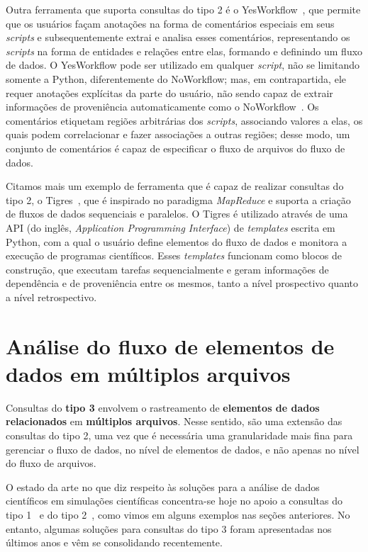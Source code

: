 Outra ferramenta que suporta consultas do tipo 2 é o YesWorkflow~\cite{mcphillips2015yesworkflow}, que permite que os usuários façam anotações na forma de comentários especiais em seus \textit{scripts} e subsequentemente extrai e analisa esses comentários, representando os \textit{scripts} na forma de entidades e relações entre elas, formando e definindo um fluxo de dados. O YesWorkflow pode ser utilizado em qualquer \textit{script}, não se limitando somente a Python, diferentemente do NoWorkflow; mas, em contrapartida, ele requer anotações explícitas da parte do usuário, não sendo capaz de extrair informações de proveniência automaticamente como o NoWorkflow~\cite{Pimentel2016}. Os comentários etiquetam regiões arbitrárias dos \textit{scripts}, associando valores a elas, os quais podem correlacionar e fazer associações a outras regiões; desse modo, um conjunto de comentários é capaz de especificar o fluxo de arquivos do fluxo de dados.

Citamos mais um exemplo de ferramenta que é capaz de realizar consultas do tipo 2, o Tigres~\cite{hendrix2016tigres}, que é inspirado no paradigma \textit{MapReduce} e suporta a criação de fluxos de dados sequenciais e paralelos. O Tigres é utilizado através de uma  API (do inglês, \textit{Application Programming Interface}) de \textit{templates} escrita em Python, com a qual o usuário define elementos do fluxo de dados e monitora a execução de programas científicos. Esses \textit{templates} funcionam como blocos de construção, que executam tarefas sequencialmente e geram informações de dependência e de proveniência entre os mesmos, tanto a nível prospectivo quanto a nível retrospectivo.

\section{Análise do fluxo de elementos de dados em múltiplos arquivos}%
\label{sec:rastreamento-de-elemento-de-dados-em-multiplos-arquivos}

Consultas do \textbf{tipo 3} envolvem o rastreamento de \textbf{elementos de dados relacionados} em \textbf{múltiplos arquivos}. Nesse sentido, são uma extensão das consultas do tipo 2, uma vez que é necessária uma granularidade mais fina para gerenciar o fluxo de dados, no nível de elementos de dados, e não apenas no nível do fluxo de arquivos.

O estado da arte no que diz respeito às soluções para a análise de dados científicos em simulações científicas concentra-se hoje no apoio a consultas do tipo 1~\cite{alagiannis2012nodb,karpathiotakis2014adaptive,wu2009fastbit,folk1999hdf5,silva2015propostadoutorado} e do tipo 2~\cite{murta2014noworkflow,mcphillips2015yesworkflow,hendrix2016tigres,Pimentel2016}, como vimos em alguns exemplos nas seções anteriores. No entanto, algumas soluções para consultas do tipo 3 foram apresentadas nos últimos anos e vêm se consolidando recentemente.


